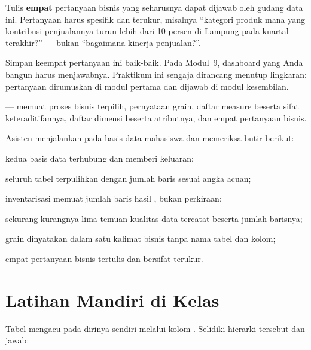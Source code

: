 Tulis \textbf{empat} pertanyaan bisnis yang seharusnya dapat dijawab oleh
gudang data ini. Pertanyaan harus spesifik dan terukur, misalnya ``kategori
produk mana yang kontribusi penjualannya turun lebih dari 10 persen di
Lampung pada kuartal terakhir?'' --- bukan ``bagaimana kinerja penjualan?''.

\begin{catatan}
Simpan keempat pertanyaan ini baik-baik. Pada Modul~9, dashboard yang Anda
bangun harus menjawabnya. Praktikum ini sengaja dirancang menutup lingkaran:
pertanyaan dirumuskan di modul pertama dan dijawab di modul kesembilan.
\end{catatan}

\begin{luaran}
 --- memuat proses bisnis
terpilih, pernyataan grain, daftar measure beserta sifat keteraditifannya,
daftar dimensi beserta atributnya, dan empat pertanyaan bisnis.
\end{luaran}

\begin{checkpoint}
Asisten menjalankan  pada basis data mahasiswa
dan memeriksa butir berikut:
\begin{ceklis}
  \item kedua basis data terhubung dan  memberi
        keluaran;
  \item seluruh tabel  terpulihkan dengan jumlah baris sesuai
        angka acuan;
  \item inventarisasi memuat jumlah baris hasil , bukan
        perkiraan;
  \item sekurang-kurangnya lima temuan kualitas data tercatat beserta jumlah
        barisnya;
  \item grain dinyatakan dalam satu kalimat bisnis tanpa nama tabel dan kolom;
  \item empat pertanyaan bisnis tertulis dan bersifat terukur.
\end{ceklis}
\end{checkpoint}

\section{Latihan Mandiri di Kelas}


Tabel  mengacu pada dirinya sendiri melalui kolom
. Selidiki hierarki tersebut dan jawab:

